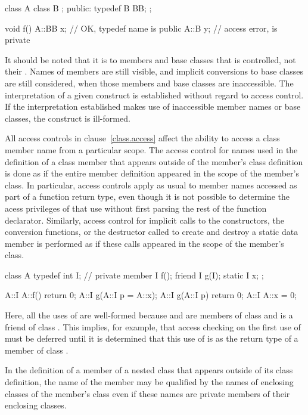 \begin{codeblock}
class A
{
	class B { };
public:
	typedef B BB;
};

void f()
{
	A::BB x;		// OK, typedef name  is public
	A::B y;			// access error,  is private
}
\end{codeblock}
\exitnoteb

\pnum
It should be noted that it is
to members and base classes that is controlled, not their
.
Names of members are still visible, and implicit conversions to base
classes are still considered, when those members and base classes are
inaccessible.
The interpretation of a given construct is
established without regard to access control.
If the interpretation
established makes use of inaccessible member names or base classes,
the construct is ill-formed.

\pnum
All access controls in clause~\ref{class.access} affect the ability to access a class member name from a particular scope. The access control for names used in
the definition of a class member that appears outside of the member's class
definition is done as if the entire member definition appeared in the scope
of the member's class. In particular, access controls apply as usual to
member names accessed as part of a function return type, even though it is not
possible to determine the acess privileges of that use without first parsing
the rest of the function declarator. Similarly, access control for implicit
calls to the constructors, the conversion functions, or the destructor called
to create and destroy a static data member is performed as if these calls
appeared in the scope of the member's class.
\enterexample

\begin{codeblock}
class A {
    typedef int I;		// private member
    I f();
    friend I g(I);
    static I x;
};

A::I A::f() { return 0; }
A::I g(A::I p = A::x);
A::I g(A::I p) { return 0; }
A::I A::x = 0;
\end{codeblock}

Here, all the uses of
are well-formed because
and 
are members of class
and
is a friend of class
.
This implies, for example, that access checking on the first use of
must be deferred until it is determined that this use of
is as the return type of a member of class
.
\exitexample

\pnum
In the definition of a member of a nested class that appears outside of its
class definition, the name of the member may be qualified by the names of
enclosing classes of the member's class even if these names are private
members of their enclosing classes.
\enterexample


